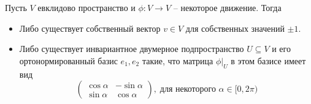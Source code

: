 \begin{claim}
\label{claim::OrthotInvarSub}
Пусть $V$ евклидово пространство и $\phi \colon V\to V$ -- некоторое движение.
Тогда
\begin{itemize}
\item Либо существует собственный вектор $v\in V$ для собственных значений $\pm 1$.

\item Либо существует инвариантное двумерное подпространство $U\subseteq V$ и его ортонормированный базис $e_1, e_2$ такие, что матрица $\phi|_U$ в этом базисе имеет вид
\[
\begin{pmatrix}
{\cos \alpha}&{-\sin \alpha}\\
{\sin \alpha}&{\cos \alpha}
\end{pmatrix}
,\;\text{для некоторого $\alpha \in [0,2\pi)$}
\]
\end{itemize}
\end{claim}
